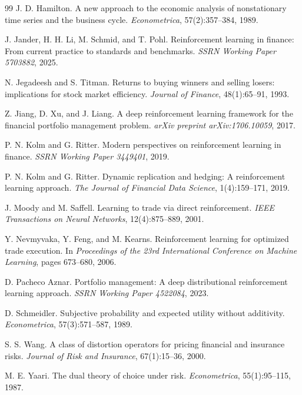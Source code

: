 \documentclass[11pt]{article}
\begin{document}
\begin{thebibliography}{99}
J. D. Hamilton.
\newblock A new approach to the economic analysis of nonstationary time series
  and the business cycle.
\newblock \emph{Econometrica}, 57(2):357--384, 1989.

J. Jander, H. H. Li, M. Schmid, and T. Pohl.
\newblock Reinforcement learning in finance: From current practice to standards
  and benchmarks.
\newblock \emph{SSRN Working Paper 5703882}, 2025.

N. Jegadeesh and S. Titman.
\newblock Returns to buying winners and selling losers: implications for stock
  market efficiency.
\newblock \emph{Journal of Finance}, 48(1):65--91, 1993.

Z. Jiang, D. Xu, and J. Liang.
\newblock A deep reinforcement learning framework for the financial portfolio
  management problem.
\newblock \emph{arXiv preprint arXiv:1706.10059}, 2017.

P. N. Kolm and G. Ritter.
\newblock Modern perspectives on reinforcement learning in finance.
\newblock \emph{SSRN Working Paper 3449401}, 2019.

P. N. Kolm and G. Ritter.
\newblock Dynamic replication and hedging: A reinforcement learning approach.
\newblock \emph{The Journal of Financial Data Science}, 1(4):159--171, 2019.

J. Moody and M. Saffell.
\newblock Learning to trade via direct reinforcement.
\newblock \emph{IEEE Transactions on Neural Networks}, 12(4):875--889, 2001.

Y. Nevmyvaka, Y. Feng, and M. Kearns.
\newblock Reinforcement learning for optimized trade execution.
\newblock In \emph{Proceedings of the 23rd International Conference on Machine
  Learning}, pages 673--680, 2006.

D. Pacheco Aznar.
\newblock Portfolio management: A deep distributional reinforcement learning
  approach.
\newblock \emph{SSRN Working Paper 4522084}, 2023.


D. Schmeidler.
\newblock Subjective probability and expected utility without additivity.
\newblock \emph{Econometrica}, 57(3):571--587, 1989.

S. S. Wang.
\newblock A class of distortion operators for pricing financial and insurance risks.
\newblock \emph{Journal of Risk and Insurance}, 67(1):15--36, 2000.

M. E. Yaari.
\newblock The dual theory of choice under risk.
\newblock \emph{Econometrica}, 55(1):95--115, 1987.


\end{thebibliography}
\end{document}
